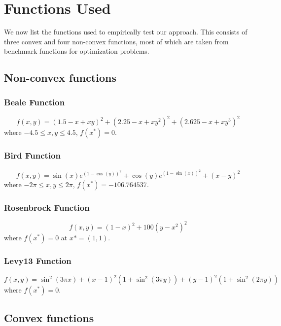 \documentclass{article}
\begin{document}
\section{Functions Used}\label{functions}
We now list the functions used to empirically test our approach. This consists of three convex and four non-convex functions, most of which are taken from benchmark functions for optimization problems.

\subsection{Non-convex functions}

\subsubsection{Beale Function}
\begin{equation}
f(x,y) = (1.5 - x + xy)^2 + (2.25 - x + xy^2)^2 + (2.625 - x + xy^3)^2	
\end{equation}
where $-4.5\le x,y \le 4.5$, $f(x^*)=0$.

\subsubsection{Bird Function}
\begin{equation}
f(x,y) = \sin(x)e^{(1-\cos(y))^2} + \cos(y)e^{(1-\sin(x))^2} + (x-y)^2
\end{equation}
where $-2\pi \le x,y \le 2\pi$, $f(x^*)=-106.764537$.

\subsubsection{Rosenbrock Function}
\begin{equation}
f(x,y) = (1-x)^2 + 100(y-x^2)^2
\end{equation}
where $f(x^*)=0$ at $x*=(1,1)$.

\subsubsection{Levy13 Function}
\begin{equation}
f(x,y) = \sin^2(3\pi x) + (x-1)^2\left(1+\sin^2(3\pi y)\right) + (y-1)^2\left(1+\sin^2(2\pi y)\right)
\end{equation}
where $f(x^*)=0$.

\subsection{Convex functions}
\end{document}

